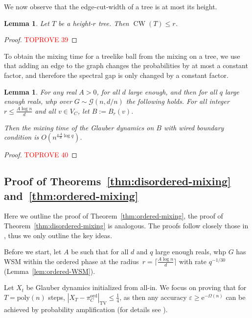 \documentclass[11pt]{article}
\theoremstyle{plain}
\newtheorem{lemma}[theorem]{Lemma}
\let\epsilon=\varepsilon
\newcommand{\G}{\mathcal{G}}
\newcommand{\emm}{\mathrm{e}}
\newcommand{\TV}{\mathrm{TV}}
\newcommand{\1}{\mathbb{1}}
\newcommand{\ord}{\mathrm{ord}}
\DeclareMathOperator{\CW}{CW}
\begin{document}
We now observe that the edge-cut-width of a tree is at most its height.

\begin{lemma}
    Let \(T\) be a height-\(r\) tree. Then 
    \(\CW(T)\leq r\).
\end{lemma}
\begin{proof}\textcolor{red}{TOPROVE 39}\end{proof}

To obtain the mixing time for a treelike ball from the mixing on a tree, we use that adding an edge to the graph changes the probabilities by at most a constant factor, and therefore the spectral gap is only changed by a constant factor.

\begin{lemma}\label{lem:wired-mixing}
    For any real \(A>0\), for all \(d\) large enough, and then for all \(q\) large enough reals, whp over \(G\sim\G(n,d/n)\) the following holds. For all integer \(r\leq \frac{A\log n}{d}\) and all \(v\in V_C\), let \(B := B_r(v)\).
    
    Then the mixing time of the Glauber dynamics on \(B\) with wired boundary condition is $O(n^{4\frac{A}{d} \log q})$.
\end{lemma}
\begin{proof}\textcolor{red}{TOPROVE 40}\end{proof}

\subsection{Proof of Theorems~\ref{thm:disordered-mixing} and~\ref{thm:ordered-mixing}}\label{sec:proof-sketch}

Here we outline the proof of Theorem~\ref{thm:ordered-mixing}, the proof of Theorem~\ref{thm:disordered-mixing} is analogous. The proofs follow closely those in \cite{galanis2024plantingmcmcsamplingpottsarxiv,SinclairsGheissari2022,Galanis_Goldberg_Smolarova_2024}, thus we only outline the key ideas.

Before we start, let \(A\) be such that for all \(d\) and \(q\) large enough reals, whp \(G\) has WSM within the ordered phase at the radius~\(r=\lceil\frac{A\log n}{d}\rceil\) with rate \(q^{-1/30}\) (Lemma~\ref{lem:ordered-WSM}).

Let \(X_t\) be Glauber dynamics initialized from all-in. We focus on proving that for \(T = \text{poly}(n)\) steps, \(|X_T-\pi^\ord_C|_\TV\leq \tfrac 14\), as then any accuracy \(\epsilon\geq \emm^{-\Omega(n)}\) can be achieved by probability amplification (for details see \cite[Theorem~3.4]{galanis2024plantingmcmcsamplingpottsarxiv}).
\end{document}
